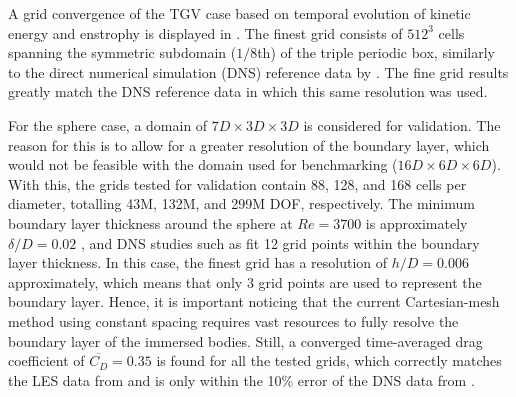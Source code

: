 \documentclass[10pt,a4paper]{article}
\begin{document}
A grid convergence of the TGV case based on temporal evolution of kinetic energy and enstrophy is displayed in . The finest grid consists of $512^3$ cells spanning the symmetric subdomain ($1/8$th) of the triple periodic box, similarly to the direct numerical simulation (DNS) reference data by \cite{Dairay2017}. The fine grid results greatly match the DNS reference data in which this same resolution was used.

For the sphere case, a domain of $7D\times3D\times3D$ is considered for validation. The reason for this is to allow for a greater resolution of the boundary layer, which would not be feasible with the domain used for benchmarking ($16D\times6D\times6D$). With this, the grids tested for validation contain 88, 128, and 168 cells per diameter, totalling 43M, 132M, and 299M DOF, respectively. The minimum boundary layer thickness around the sphere at $Re=3700$ is approximately $\delta/D=0.02$ \citep{Capuano2023}, and DNS studies such as \cite{Rodriguez2011} fit 12 grid points within the boundary layer thickness. In this case, the finest grid has a resolution of $h/D=0.006$ approximately, which means that only 3 grid points are used to represent the boundary layer. Hence, it is important noticing that the current Cartesian-mesh method using constant spacing requires vast resources to fully resolve the boundary layer of the immersed bodies. Still, a converged time-averaged drag coefficient of $\overline{C_D}=0.35$ is found for all the tested grids, which correctly matches the LES data from \cite{Yun2006} and is only within the 10\% error of the DNS data from \cite{Rodriguez2011}.

\end{document}
